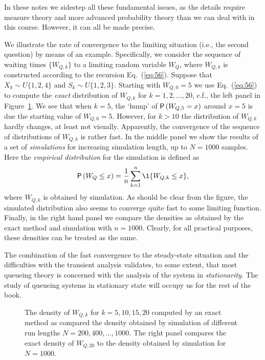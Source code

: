 In these notes we sidestep all these fundamental issues, as the
details require measure theory and more advanced probability theory
than we can deal with in this course. However, it can all be made
precise. 

We illustrate the rate of convergence to the limiting situation (i.e., the second question) by means of an example. Specifically, we consider the sequence of waiting times $\{W_{Q,k}\}$ to a limiting random variable $W_Q$, where $W_{Q,k}$ is constructed according to the recursion
Eq.~(\ref{eq:56}). Suppose that $X_k\sim U\{1,2,4\}$ and
$S_k\sim U\{1,2,3\}$.  Starting with $W_{Q,0}=5$ we use
Eq.~(\ref{eq:56}) to compute the \emph{exact} distribution of
$W_{Q,k}$ for $k=1,2,\ldots, 20$, c.f., the left panel in
Figure~\ref{fig:convergence}. We see that when $k=5$, the `hump' of
$\P{W_{Q,5}=x}$ around $x=5$ is due the starting value of
$W_{Q,0}=5$. However, for $k>10$ the distribution of $W_{Q,k}$ hardly
changes, at least not visually. Apparently, the convergence of the
sequence of distributions of $W_{Q,k}$ is rather fast. In the middle
panel we show the results of a set of \emph{simulations} for
increasing simulation length, up to $N=1000$ samples. Here the
\emph{empirical distribution} for the simulation is defined as
\begin{equation*}
\P{W_Q\leq x} =   \frac 1n \sum_{k=1}^n \1{W_{Q,k} \leq x},
\end{equation*}
where $W_{Q,k}$ is obtained by simulation. As should be clear from the
figure, the simulated distribution also seems to converge quite fast to
some limiting function. Finally, in the right hand panel we compare
the densities as obtained by the exact method and simulation with
$n=1000$. Clearly, for all practical purposes, these densities can be
treated as the same.

The combination of the fast convergence to the steady-state situation
and the difficulties with the transient analysis validates, to some
extent, that most queueing theory is concerned with the analysis of
the system in \emph{stationarity}. The study of queueing systems in
stationary state will occupy us for the rest of the book.

\begin{figure}
  \centering



  \caption{The density of $W_{Q,k}$ for $k=5, 10, 15, 20$ computed by
    an exact method as compared the density obtained by simulation of
    different run lengths $N=200, 400, \ldots, 1000$. The right panel
    compares the exact density of $W_{Q,20}$ to the density obtained by simulation
    for $N=1000$.}
\label{fig:convergence}
\end{figure}




